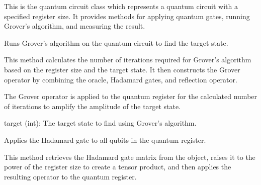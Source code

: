 \documentclass[letterpaper,10pt,english]{sphinxmanual}
\begin{document}
\begin{fulllineitems}
\label{\detokenize{index:qc.Circuit}}
\pysigstartsignatures
{}
\pysigstopsignatures
\sphinxAtStartPar
This is the quantum circuit class which represents a quantum circuit with a
specified register size. It provides methods for applying quantum gates,
running Grover’s algorithm, and measuring the result.

\begin{fulllineitems}
\label{\detokenize{index:qc.Circuit.grover}}
\pysigstartsignatures
{}
\pysigstopsignatures
\sphinxAtStartPar
Runs Grover’s algorithm on the quantum circuit to find the target state.

\sphinxAtStartPar
This method calculates the number of iterations required for Grover’s
algorithm based on the register size and the target state. It then
constructs the Grover operator by combining the oracle, Hadamard gates,
and reflection operator.

\sphinxAtStartPar
The Grover operator is applied to the quantum register for the calculated
number of iterations to amplify the amplitude of the target state.
\begin{description}
\sphinxAtStartPar
target (int): The target state to find using Grover’s algorithm.

\end{description}

\end{fulllineitems}


\begin{fulllineitems}
\label{\detokenize{index:qc.Circuit.h}}
\pysigstartsignatures
{}
\pysigstopsignatures
\sphinxAtStartPar
Applies the Hadamard gate to all qubits in the quantum register.

\sphinxAtStartPar
This method retrieves the Hadamard gate matrix from the  object,
raises it to the power of the register size to create a tensor product,
and then applies the resulting operator to the quantum register.


\end{fulllineitems}
\end{fulllineitems}
\end{document}
